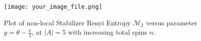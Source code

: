 \documentclass[12pt]{article}
\begin{document}
\begin{figure}[ht]
    \centering
    \texttt{[image: your\_image\_file.png]}
    \caption{Plot of non-local Stabilizer Renyi Entropy $\mathcal{M}_2$ versus parameter $g = \theta - \frac{\pi}{4}$, at $|A|=5$ with increasing total spins $n$.}
    \label{fig:non_local_stabilizer_entropy}
\end{figure}
\end{document}
